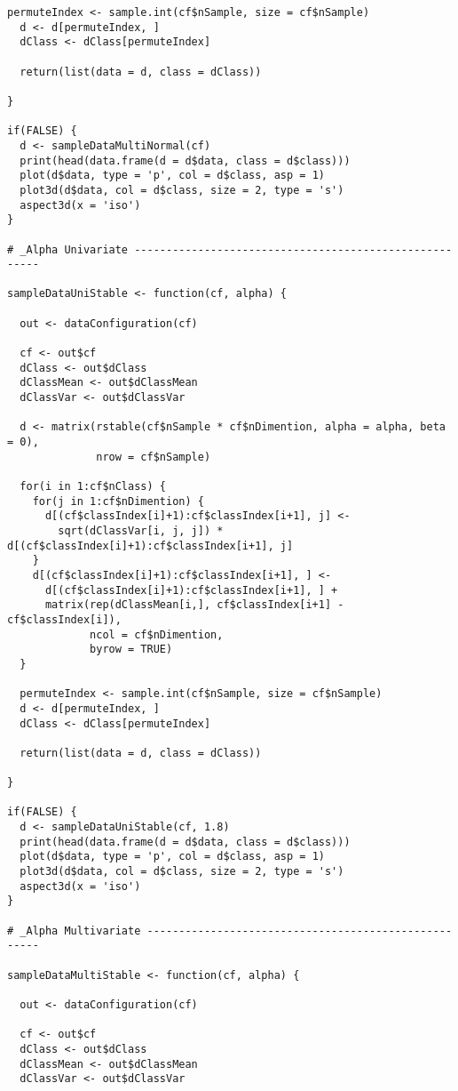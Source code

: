 \begin{latin}
\begin{Verbatim}[breaklines=true, breakanywhere=true, baselinestretch=1]
  permuteIndex <- sample.int(cf$nSample, size = cf$nSample)
  d <- d[permuteIndex, ]
  dClass <- dClass[permuteIndex]
  
  return(list(data = d, class = dClass))
  
}

if(FALSE) {
  d <- sampleDataMultiNormal(cf)
  print(head(data.frame(d = d$data, class = d$class)))
  plot(d$data, type = 'p', col = d$class, asp = 1)
  plot3d(d$data, col = d$class, size = 2, type = 's')
  aspect3d(x = 'iso')
}

# _Alpha Univariate -------------------------------------------------------

sampleDataUniStable <- function(cf, alpha) {
  
  out <- dataConfiguration(cf)
  
  cf <- out$cf
  dClass <- out$dClass
  dClassMean <- out$dClassMean
  dClassVar <- out$dClassVar
  
  d <- matrix(rstable(cf$nSample * cf$nDimention, alpha = alpha, beta = 0),
              nrow = cf$nSample)
  
  for(i in 1:cf$nClass) {
    for(j in 1:cf$nDimention) {
      d[(cf$classIndex[i]+1):cf$classIndex[i+1], j] <-
        sqrt(dClassVar[i, j, j]) * d[(cf$classIndex[i]+1):cf$classIndex[i+1], j]
    }
    d[(cf$classIndex[i]+1):cf$classIndex[i+1], ] <- 
      d[(cf$classIndex[i]+1):cf$classIndex[i+1], ] +
      matrix(rep(dClassMean[i,], cf$classIndex[i+1] - cf$classIndex[i]), 
             ncol = cf$nDimention,
             byrow = TRUE)
  }
  
  permuteIndex <- sample.int(cf$nSample, size = cf$nSample)
  d <- d[permuteIndex, ]
  dClass <- dClass[permuteIndex]
  
  return(list(data = d, class = dClass))
  
}

if(FALSE) {
  d <- sampleDataUniStable(cf, 1.8)
  print(head(data.frame(d = d$data, class = d$class)))
  plot(d$data, type = 'p', col = d$class, asp = 1)
  plot3d(d$data, col = d$class, size = 2, type = 's')
  aspect3d(x = 'iso')
}

# _Alpha Multivariate -----------------------------------------------------

sampleDataMultiStable <- function(cf, alpha) {
  
  out <- dataConfiguration(cf)
  
  cf <- out$cf
  dClass <- out$dClass
  dClassMean <- out$dClassMean
  dClassVar <- out$dClassVar
  

\end{Verbatim}
\end{latin}
